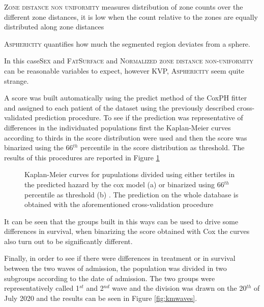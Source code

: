 {\scshape Zone distance non uniformity} measures distribution of zone counts over the different zone distances, it is low when the count relative to the zones are equally distributed along zone distances

{\scshape Asphericity} quantifies how much the segmented region deviates from a sphere.


In this case{\scshape Sex} and {\scshape FatSurface} and {\scshape Normalized zone distance non-uniformity} can be reasonable variables to expect, however {\scshape KVP, Asphericity} seem quite strange.

A score was built automatically using the predict method of the CoxPH fitter and assigned to each patient of the dataset using the previously described cross-validated prediction procedure.
To see if the prediction was representative of differences in the individuated populations first the Kaplan-Meier curves according to thirds in the score distribution were used and then the score was binarized using the 66$^{th}$ percentile in the score distribution as threshold.
The results of this procedures are reported in Figure \ref{fig:KmCoxScore}

\begin{figure}[H]
\centering
	\newline
        \caption{Kaplan-Meier curves for pupulations divided using either tertiles in the predicted hazard by the cox model (a) or binarized using 66$^{th}$ percentile as threshold (b) . The prediction on the whole database is obtained with the aforementioned cross-validation procedure }\label{fig:KmCoxScore}
\end{figure}

It can be seen that the groups built in this ways can be used to drive some differences in survival, when binarizing the score obtained with Cox the curves also turn out to be significantly different.

Finally, in order to see if there were differences in treatment or in survival between the two waves of admission, the population was divided in two subgroups according to the date of admission. 
The two groups were representatively called 1$^{st}$ and 2$^{nd}$ wave and the division was drawn on the 20$^{th}$ of July 2020 and the results can be seen in Figure \ref{fig:kmwaves}.

